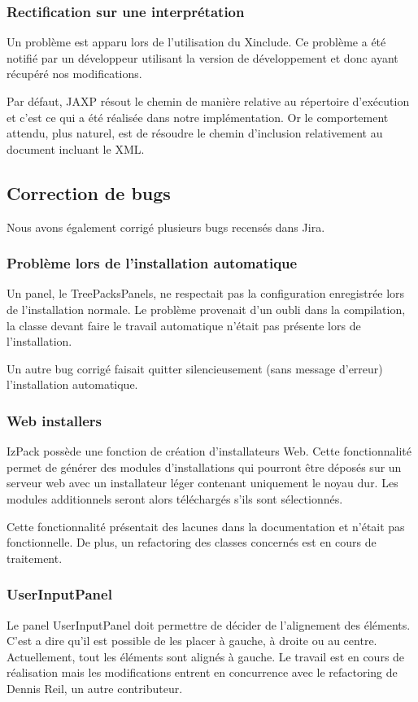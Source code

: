\subsubsection{Rectification sur une interprétation}
Un problème est apparu lors de l'utilisation du Xinclude.
Ce problème a été notifié par un développeur utilisant la version de développement et donc ayant récupéré nos modifications.

Par défaut, JAXP résout le chemin de manière relative au répertoire d'exécution et c'est ce qui a été réalisée dans notre implémentation.
Or le comportement attendu, plus naturel, est de résoudre le chemin d'inclusion relativement au document incluant le XML.

\subsection{Correction de bugs}
Nous avons également corrigé plusieurs bugs recensés dans Jira.
\subsubsection{Problème lors de l'installation automatique}
Un panel, le TreePacksPanels, ne respectait pas la configuration enregistrée lors de l'installation normale.
Le problème provenait d'un oubli dans la compilation, la classe devant faire le travail automatique n'était pas présente lors de l'installation.

Un autre bug corrigé faisait quitter silencieusement (sans message d'erreur) l'installation automatique.
\subsubsection{Web installers}
IzPack possède une fonction de création d'installateurs Web.
Cette fonctionnalité permet de générer des modules d'installations qui pourront être déposés sur un serveur web avec un installateur léger contenant uniquement le noyau dur.
Les modules additionnels seront alors téléchargés s'ils sont sélectionnés.

Cette fonctionnalité présentait des lacunes dans la documentation et n'était pas fonctionnelle.
De plus, un refactoring des classes concernés est en cours de traitement.
\subsubsection{UserInputPanel}
Le panel UserInputPanel doit permettre de décider de l'alignement des éléments.
C'est a dire qu'il est possible de les placer à gauche, à droite ou au centre. Actuellement, tout les éléments sont alignés à gauche.
Le travail est en cours de réalisation mais les modifications entrent en concurrence avec le refactoring de Dennis Reil, un autre contributeur.

